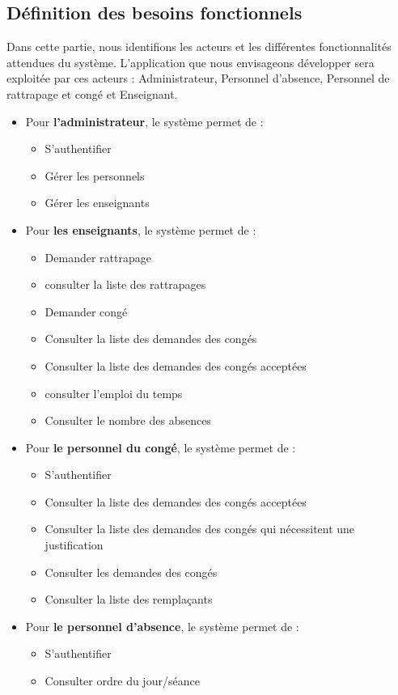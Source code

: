 \documentclass[12 pt ]{report}
\begin{document}
\subsection{Définition des besoins fonctionnels}
Dans cette partie, nous identifions les acteurs et les différentes fonctionnalités attendues du système. L’application que nous envisageons développer sera exploitée par ces acteurs : Administrateur, Personnel d’absence, Personnel de rattrapage et congé et Enseignant.
\begin{itemize}[font=\color{black} \Large, label=]
\item  	Pour \textbf{l’administrateur}, le système permet de :
\begin{itemize}[font=\color{black} \Large, label=]
\item S’authentifier
\item Gérer les personnels
\item	Gérer les enseignants
\end{itemize}
\newpage
\item  	Pour \textbf{les enseignants}, le système permet de :
\begin{itemize}[font=\color{black} \Large, label=]
\item 	Demander rattrapage
\item consulter la liste des rattrapages
\item 	Demander congé
\item Consulter la liste des demandes des congés 
	\item Consulter la liste des demandes des congés acceptées
		
		\item consulter l'emploi du temps

\item Consulter le nombre des absences
\end{itemize}




\item Pour\textbf{ le personnel du congé}, le système permet de : 
\begin{itemize}[font=\color{black} \Large, label=]

\item S’authentifier
\item 	Consulter la liste des demandes des congés acceptées
\item 	Consulter la liste des demandes des congés qui nécessitent une justification
\item Consulter les demandes des congés
\item 	Consulter la liste des remplaçants

\end{itemize}
\item  	Pour \textbf{ le personnel d’absence}, le système permet de : 
\begin{itemize}[font=\color{black} \Large, label=]
\item S’authentifier
\item Consulter ordre du jour/séance

\end{itemize}

\end{itemize}
\end{document}
